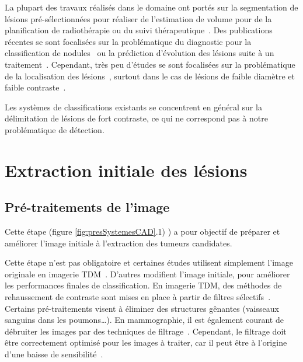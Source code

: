 La plupart des travaux réalisés dans le domaine ont portés sur la segmentation de lésions pré-sélectionnées pour réaliser de l'estimation de volume pour de la planification de radiothérapie ou du suivi thérapeutique~\cite{kanakatte2007pilot, potesil2007automated, kanakatte2008pulmonary, yu2009automated}. Des publications récentes se sont focalisées sur la problématique du diagnostic pour la classification de nodules~\cite{nie2006integrating} ou la prédiction d'évolution des lésions suite à un traitement~\cite{el2009exploring}. Cependant, très peu d'études se sont focalisées sur la problématique de la localisation des lésions~\cite{guan2006automatic, kanakatte2007pilot, kanakatte2008pulmonary, mhd2010artificial}, surtout dans le cas de lésions de faible diamètre et faible contraste~\cite{ying2004novel, jafar2006computerized, saradhi2009framework}.

Les systèmes de classifications existants se concentrent en général sur la délimitation de lésions de fort contraste, ce qui ne correspond pas à notre problématique de détection. 


\section{Extraction initiale des lésions}

	\subsection{Pré-traitements de l'image}

Cette étape (figure \ref{fig:presSystemesCAD}.1) ) a pour objectif de préparer et améliorer l’image initiale à l’extraction des tumeurs candidates. 

Cette étape n'est pas obligatoire et certaines études utilisent simplement l’image originale en imagerie TDM~\cite{mougiakakou2007differential}. D’autres modifient l’image initiale, pour améliorer les performances finales de classification. En imagerie TDM, des méthodes de rehaussement de contraste sont mises en place à partir de filtres sélectifs~\cite{li2003selective}. Certains pré-traitements visent à éliminer des structures gênantes (vaisseaux sanguins dans les poumons…). En mammographie, il est également courant de débruiter les images par des techniques de filtrage~\cite{bazzani2001svm}. Cependant, le filtrage doit être correctement optimisé pour les images à traiter, car il peut être à l'origine d'une baisse de sensibilité~\cite{ge2005computer}.
	
